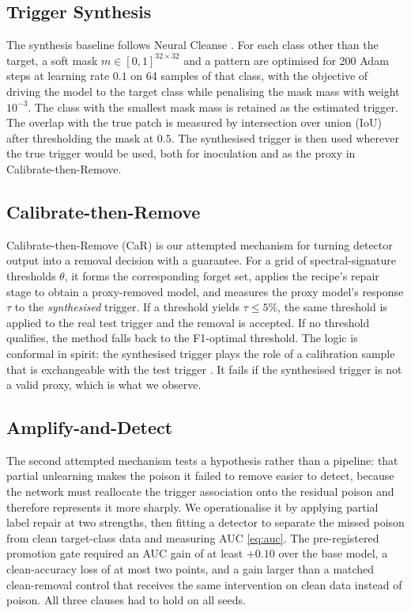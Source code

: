 \subsection{Trigger Synthesis}
The synthesis baseline follows Neural Cleanse \cite{nc}. For each class other
than the target, a soft mask $m\in[0,1]^{32\times32}$ and a pattern are optimised
for 200 Adam steps at learning rate $0.1$ on 64 samples of that class, with the
objective of driving the model to the target class while penalising the mask
mass with weight $10^{-3}$. The class with the smallest mask mass is retained as
the estimated trigger. The overlap with the true patch is measured by
intersection over union (IoU) after thresholding the mask at $0.5$. The
synthesised trigger is then used wherever the true trigger would be used, both
for inoculation and as the proxy in Calibrate-then-Remove.

\subsection{Calibrate-then-Remove}
Calibrate-then-Remove (CaR) is our attempted mechanism for turning detector
output into a removal decision with a guarantee. For a grid of spectral-signature
thresholds $\theta$, it forms the corresponding forget set, applies the recipe's
repair stage to obtain a proxy-removed model, and measures the proxy model's
response $\tau$ to the \emph{synthesised} trigger. If a threshold yields
$\tau\leq5\%$, the same threshold is applied to the real test trigger and the
removal is accepted. If no threshold qualifies, the method falls back to the
F1-optimal threshold. The logic is conformal in spirit: the synthesised trigger
plays the role of a calibration sample that is exchangeable with the test
trigger \cite{vovk,angelopoulos}. It fails if the synthesised trigger is not a
valid proxy, which is what we observe.

\subsection{Amplify-and-Detect}
The second attempted mechanism tests a hypothesis rather than a pipeline: that
partial unlearning makes the poison it failed to remove easier to detect, because
the network must reallocate the trigger association onto the residual poison and
therefore represents it more sharply. We operationalise it by applying partial
label repair at two strengths, then fitting a detector to separate the missed
poison from clean target-class data and measuring AUC \eqref{eq:auc}. The
pre-registered promotion gate required an AUC gain of at least $+0.10$ over the
base model, a clean-accuracy loss of at most two points, and a gain larger than a
matched clean-removal control that receives the same intervention on clean data
instead of poison. All three clauses had to hold on all seeds.

